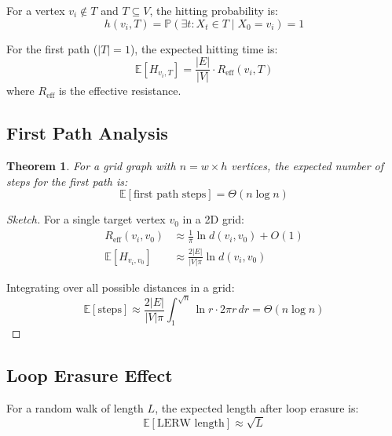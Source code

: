 \documentclass[twocolumn,10pt]{article}
\newtheorem{theorem}{Theorem}
\begin{document}
For a vertex $v_i \not\in T$ and $T \subseteq V$, the hitting probability is:
\begin{equation}
h(v_i, T) = \mathbb{P}(\exists t : X_t \in T \mid X_0 = v_i) = 1
\end{equation}

For the first path ($|T|=1$), the expected hitting time is:
\begin{equation}
\mathbb{E}[H_{v_i,T}] = \frac{|E|}{|V|} \cdot R_{\text{eff}}(v_i, T)
\end{equation}
where $R_{\text{eff}}$ is the effective resistance.

\subsection{First Path Analysis}

\begin{theorem}
For a grid graph with $n = w \times h$ vertices, the expected number of steps for the first path is:
\begin{equation}
\mathbb{E}[\text{first path steps}] = \Theta(n\log n)
\end{equation}
\end{theorem}

\begin{proof}[Sketch]
For a single target vertex $v_0$ in a 2D grid:
\begin{align}
R_{\text{eff}}(v_i, v_0) &\approx \frac{1}{\pi}\ln d(v_i, v_0) + O(1)\\
\mathbb{E}[H_{v_i,v_0}] &\approx \frac{2|E|}{|V|\pi}\ln d(v_i, v_0)
\end{align}

Integrating over all possible distances in a grid:
\begin{equation}
\mathbb{E}[\text{steps}] \approx \frac{2|E|}{|V|\pi} \int_{1}^{\sqrt{n}} \ln r \cdot 2\pi r \, dr = \Theta(n\log n)
\end{equation}
\end{proof}

\subsection{Loop Erasure Effect}

For a random walk of length $L$, the expected length after loop erasure is:
\begin{equation}
\mathbb{E}[\text{LERW length}] \approx \sqrt{L}
\end{equation}
\end{document}
